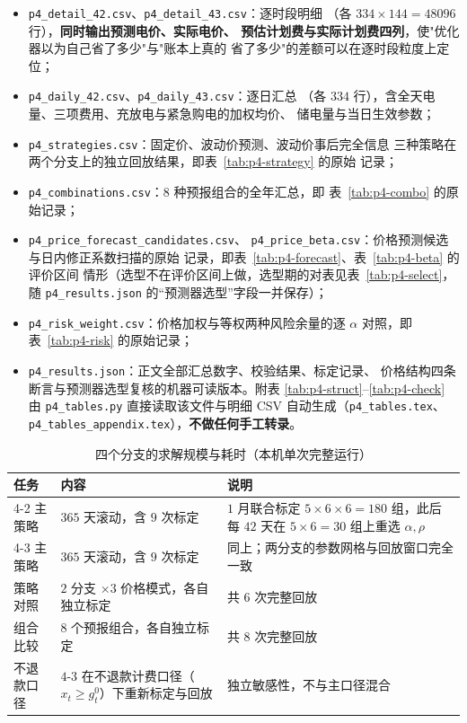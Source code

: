 \documentclass[withoutpreface,bwprint]{cumcmthesis}
\begin{document}
\begin{appendices}
\begin{itemize}
  \item \texttt{p4\_detail\_42.csv}、\texttt{p4\_detail\_43.csv}：逐时段明细
        （各 $334\times144=48096$ 行），\textbf{同时输出预测电价、实际电价、
        预估计划费与实际计划费四列}，使"优化器以为自己省了多少"与"账本上真的
        省了多少"的差额可以在逐时段粒度上定位；
  \item \texttt{p4\_daily\_42.csv}、\texttt{p4\_daily\_43.csv}：逐日汇总
        （各 $334$ 行），含全天电量、三项费用、充放电与紧急购电的加权均价、
        储电量与当日生效参数；
  \item \texttt{p4\_strategies.csv}：固定价、波动价预测、波动价事后完全信息
        三种策略在两个分支上的独立回放结果，即表~\ref{tab:p4-strategy} 的原始
        记录；
  \item \texttt{p4\_combinations.csv}：$8$ 种预报组合的全年汇总，即
        表~\ref{tab:p4-combo} 的原始记录；
  \item \texttt{p4\_price\_forecast\_candidates.csv}、
        \texttt{p4\_price\_beta.csv}：价格预测候选与日内修正系数扫描的原始
        记录，即表~\ref{tab:p4-forecast}、表~\ref{tab:p4-beta} 的评价区间
        情形（选型不在评价区间上做，选型期的对表见表~\ref{tab:p4-select}，
        随 \texttt{p4\_results.json} 的``预测器选型''字段一并保存）；
  \item \texttt{p4\_risk\_weight.csv}：价格加权与等权两种风险余量的逐 $\alpha$
        对照，即表~\ref{tab:p4-risk} 的原始记录；
  \item \texttt{p4\_results.json}：正文全部汇总数字、校验结果、标定记录、
        价格结构四条断言与预测器选型复核的机器可读版本。附表
        \ref{tab:p4-struct}--\ref{tab:p4-check} 由 \texttt{p4\_tables.py}
        直接读取该文件与明细 CSV 自动生成（\texttt{p4\_tables.tex}、
        \texttt{p4\_tables\_appendix.tex}），\textbf{不做任何手工转录}。
\end{itemize}

\begin{table}[htbp]
  \centering
  \caption{四个分支的求解规模与耗时（本机单次完整运行）}
  \label{tab:p4-cost}
  \footnotesize
  \begin{tabular}{lll}
    \toprule
    任务 & 内容 & 说明 \\
    \midrule
    4-2 主策略 & $365$ 天滚动，含 $9$ 次标定 & $1$ 月联合标定 $5\times6\times6=180$ 组，此后每 $42$ 天在 $5\times6=30$ 组上重选 $\alpha,\rho$ \\
    4-3 主策略 & $365$ 天滚动，含 $9$ 次标定 & 同上；两分支的参数网格与回放窗口完全一致 \\
    策略对照 & $2$ 分支 $\times3$ 价格模式，各自独立标定 & 共 $6$ 次完整回放 \\
    组合比较 & $8$ 个预报组合，各自独立标定 & 共 $8$ 次完整回放 \\
    不退款口径 & $4$-3 在不退款计费口径（$x_t\ge g_t^0$）下重新标定与回放 & 独立敏感性，不与主口径混合 \\
    \bottomrule
  \end{tabular}
\end{table}


\end{appendices}
\end{document}
